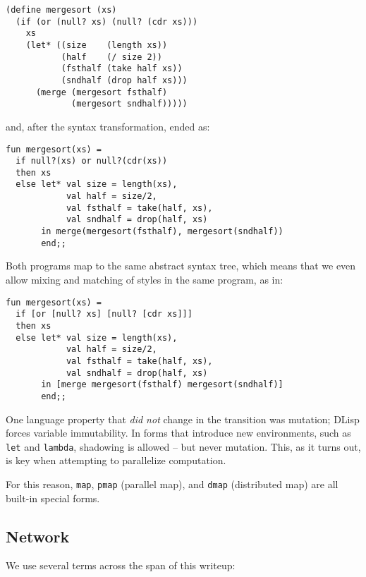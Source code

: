 \documentclass[letterpaper,twocolumn,10pt]{article}
\begin{document}
\begin{verbatim}
(define mergesort (xs)
  (if (or (null? xs) (null? (cdr xs)))
    xs
    (let* ((size    (length xs))
           (half    (/ size 2))
           (fsthalf (take half xs))
           (sndhalf (drop half xs)))
      (merge (mergesort fsthalf)
             (mergesort sndhalf)))))
\end{verbatim}

and, after the syntax transformation, ended as:

\begin{verbatim}
fun mergesort(xs) =
  if null?(xs) or null?(cdr(xs))
  then xs
  else let* val size = length(xs),
            val half = size/2,
            val fsthalf = take(half, xs),
            val sndhalf = drop(half, xs)
       in merge(mergesort(fsthalf), mergesort(sndhalf))
       end;;
\end{verbatim}

Both programs map to the same abstract syntax tree, which means that we even
allow mixing and matching of styles in the same program, as in:

\begin{verbatim}
fun mergesort(xs) =
  if [or [null? xs] [null? [cdr xs]]]
  then xs
  else let* val size = length(xs),
            val half = size/2,
            val fsthalf = take(half, xs),
            val sndhalf = drop(half, xs)
       in [merge mergesort(fsthalf) mergesort(sndhalf)]
       end;;
\end{verbatim}

One language property that \textit{did not} change in the transition was
mutation; DLisp forces variable immutability. In forms that introduce new
environments, such as \verb|let| and \verb|lambda|, shadowing is allowed -- but
never mutation. This, as it turns out, is key when attempting to parallelize
computation.

For this reason, \verb|map|, \verb|pmap| (parallel map), and \verb|dmap|
(distributed map) are all built-in special forms.

\subsection{Network}

We use several terms across the span of this writeup:
\end{document}
